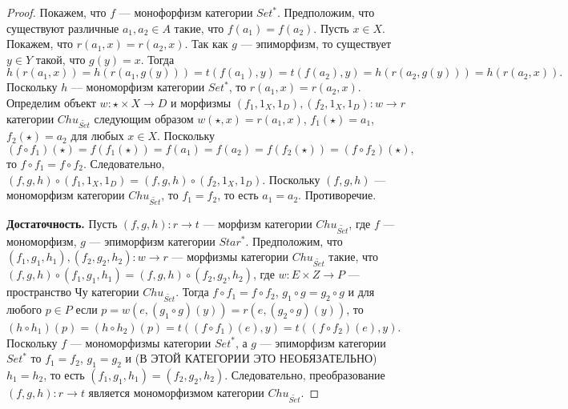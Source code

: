 \documentclass[a4paper,12pt]{article}
\begin{document}
\begin{proof}
    Покажем, что $f$ --- монофорфизм категории $Set^*$. Предположим, что существуют различные $a_1, a_2 \in A$ такие, что $f(a_1) = f(a_2)$. Пусть $x \in X$. Покажем, что $r(a_1,x) = r(a_2,x)$. Так как $g$ --- эпиморфизм, то существует $y \in Y$ такой, что $g(y) = x$. Тогда
    $$
        h(r(a_1,x)) = h(r(a_1,g(y))) = t(f(a_1),y) = t(f(a_2),y) = h(r(a_2,g(y))) = h(r(a_2,x)).
    $$
    Поскольку $h$ --- мономорфизм категории $Set^*$, то $r(a_1,x) = r(a_2,x)$. Определим объект $w: \star \times X \to D$ и морфизмы $(f_1,1_X,1_D), (f_2,1_X,1_D): w \to r$ категории $Chu_{\widetilde{Set}}$ следующим образом $w(\star,x) = r(a_1,x)$, $f_1(\star) = a_1$, $f_2(\star) = a_2$ для любых $x \in X$. Поскольку
    $$
        (f \circ f_1)(\star) = f(f_1(\star)) = f(a_1) = f(a_2) = f(f_2(\star)) = (f \circ f_2)(\star),
    $$
    то $f \circ f_1 = f \circ f_2$. Следовательно, $(f,g,h) \circ (f_1,1_X,1_D) = (f,g,h) \circ (f_2,1_X,1_D)$. Поскольку $(f,g,h)$ --- мономорфизм категории $Chu_{\widetilde{Set}}$, то $f_1 = f_2$, то есть $a_1 = a_2$. Противоречие.

    \textbf{Достаточность.} Пусть $(f,g,h): r \to t$ --- морфизм категории $Chu_{\widetilde{Set}}$, где $f$ --- мономорфизм, $g$ --- эпиморфизм категории $Star^*$. Предположим, что $(f_1,g_1,h_1), (f_2,g_2,h_2): w \to r$ --- морфизмы категории $Chu_{\widetilde{Set}}$ такие, что $(f,g,h) \circ (f_1,g_1,h_1) = (f,g,h) \circ (f_2,g_2,h_2)$, где $w: E \times Z \to P$ --- пространство Чу категории $Chu_{\widetilde{Set}}$. Тогда $f \circ f_1 = f \circ f_2$, $g_1 \circ g = g_2 \circ g$ и для любого $p \in P$ если $p = w(e,(g_1 \circ g)(y)) = r(e,(g_2 \circ g)(y))$, то $(h \circ h_1)(p) = (h \circ h_2)(p) = t((f \circ f_1)(e), y) = t((f \circ f_2)(e), y)$. Поскольку $f$ --- мономорфизмы категории $Set^*$, а $g$ --- эпиморфизм категории $Set^*$ то $f_1 = f_2$, $g_1 = g_2$ и (В ЭТОЙ КАТЕГОРИИ ЭТО НЕОБЯЗАТЕЛЬНО) $h_1 = h_2$, то есть $(f_1,g_1,h_1) = (f_2,g_2,h_2)$. Следовательно, преобразование $(f,g,h): r \to t$ является мономорфизмом категории $Chu_{\widetilde{Set}}$.
\end{proof}
\end{document}
